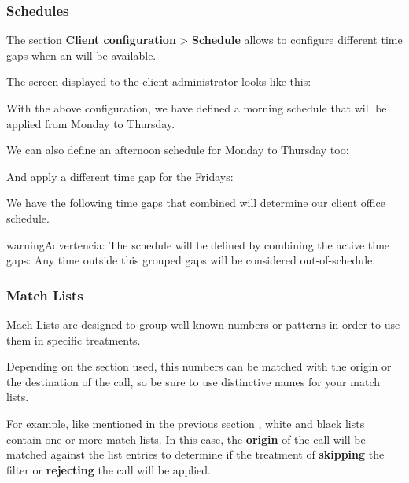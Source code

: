 \documentclass[letterpaper,10pt,spanish]{sphinxmanual}
\begin{document}
\subsubsection{Schedules}
\label{administration_portal/client/vpbx/routing_tools/schedules::doc}\label{administration_portal/client/vpbx/routing_tools/schedules:schedules}
The section \textbf{Client configuration} \textgreater{} \textbf{Schedule} allows to configure
different time gaps when an {\hyperref[administration_portal/client/vpbx/ddis:ddis]{}} will be available.

The screen displayed to the client administrator looks like this:

With the above configuration, we have defined a morning schedule that will be
applied from Monday to Thursday.

We can also define an afternoon schedule for Monday to Thursday too:

And apply a different time gap for the Fridays:

We have the following time gaps that combined will determine our client
office schedule.

\begin{notice}{warning}{Advertencia:}
The schedule will be defined by combining the active time gaps:
Any time outside this grouped gaps will be considered out-of-schedule.
\end{notice}


\subsubsection{Match Lists}
\label{administration_portal/client/vpbx/routing_tools/match_lists:match-lists}\label{administration_portal/client/vpbx/routing_tools/match_lists::doc}\label{administration_portal/client/vpbx/routing_tools/match_lists:id1}
Mach Lists are designed to group well known numbers or patterns in order to use
them in specific treatments.

Depending on the section used, this numbers can be matched with the origin or
the destination of the call, so be sure to use distinctive names for your match
lists.

For example, like mentioned in the previous section {\hyperref[administration_portal/client/vpbx/routing_tools/external_call_filters:external\string-filters]{}},
white and black lists contain one or more match lists. In this case, the
\textbf{origin} of the call will be matched against the list entries to determine if
the treatment of \textbf{skipping} the filter or \textbf{rejecting} the call will be applied.
\end{document}
